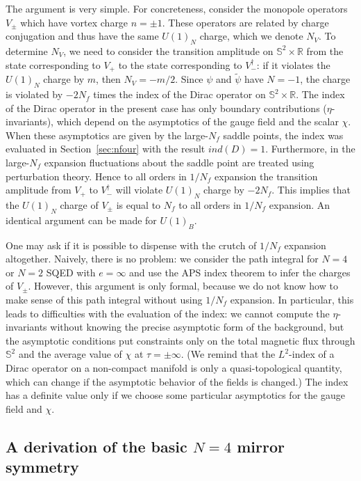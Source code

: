 \documentclass[a4paper,12pt, amsfonts, amssymb]{article}
\newcommand{\RR}{{\mathbb R}}
\renewcommand{\SS}{{\mathbb S}}
\newcommand{\tpsi}{{\tilde \psi}}
\newcommand{\n}{{N_V}}
\begin{document}
The argument is very simple. For concreteness, consider the monopole
operators $V_\pm$ which have vortex charge $n=\pm 1$. These operators
are related by charge conjugation and thus have the same $U(1)_N$ charge,
which we denote $\n$. To determine $\n$, we need to consider the
transition amplitude on $\SS^2\times\RR$ from the state corresponding to 
$V_+$ to the state corresponding to $V_-^\dag$: if it violates the 
$U(1)_N$ charge by $m$, then $\n=-m/2$. Since $\psi$ and $\tpsi$ have
$N=-1$, the charge is violated by $-2N_f$ times the index of the Dirac
operator on $\SS^2\times\RR$. The index of the Dirac operator in the
present case has only boundary contributions ($\eta$-invariants),
which depend on the asymptotics of the gauge field and the scalar $\chi.$
When these asymptotics are given by the large-$N_f$ saddle points,
the index was evaluated in Section~\ref{sec:nfour} with the result
$ind(D)=1.$ Furthermore, in the large-$N_f$ expansion fluctuations
about the saddle point are treated using perturbation theory.
Hence to all orders in $1/N_f$ expansion the transition amplitude
from $V_+$ to $V_-^\dag$ will violate $U(1)_N$ charge by $-2N_f$.
This implies that the $U(1)_N$ charge of $V_\pm$ is equal to $N_f$ to
all orders in $1/N_f$ expansion. An identical argument can be made for
$U(1)_B$.

One may ask if it is possible to dispense with the crutch of $1/N_f$ expansion
altogether. Naively, there is no problem: we consider the path
integral for $N=4$ or $N=2$ SQED with $e=\infty$ and use the
APS index theorem to infer the charges of $V_\pm.$ However, this
argument is only formal, because we do not know how to make sense
of this path integral without using $1/N_f$ expansion. In particular,
this leads to difficulties with the evaluation of the index: we cannot compute
the $\eta$-invariants without knowing the precise asymptotic form of the
background, but the asymptotic conditions put constraints only on
the total magnetic flux through $\SS^2$ and the average value of
$\chi$ at $\tau=\pm\infty.$ (We remind that the $L^2$-index of a Dirac
operator on a non-compact manifold is only a quasi-topological quantity,
which can change if the asymptotic behavior of the fields is changed.)
The index has a definite value only if we choose some particular
asymptotics for the gauge field and $\chi$.


\subsection{A derivation of the basic $N=4$ mirror symmetry}
\end{document}
